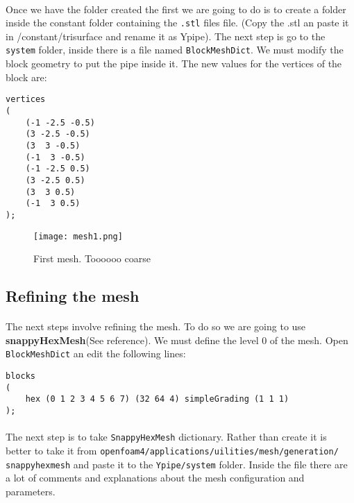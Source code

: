 \paragraph{}Once we have the folder created the first we are going to do is to create a folder inside the constant folder containing the \texttt{.stl} files file. (Copy the .stl an paste it in /constant/trisurface and rename it as Ypipe). The next step is  go to the  \texttt{system} folder, inside there is a file named \texttt{BlockMeshDict}. We must modify the block geometry to put the pipe inside it. The new values for the vertices of the block are:
\begin{center}
\begin{lstlisting}
vertices
(
    (-1 -2.5 -0.5)
    (3 -2.5 -0.5)
    (3  3 -0.5)
    (-1  3 -0.5)
    (-1 -2.5 0.5)
    (3 -2.5 0.5)
    (3  3 0.5)
    (-1  3 0.5)
);
\end{lstlisting}
\end{center}
\begin{figure}[h!]
\centering
\texttt{[image: mesh1.png]}
\caption{First mesh. Toooooo coarse}
\end{figure}

\subsection{Refining the mesh}
\paragraph{}The next steps involve refining the mesh. To do so we are going to use \textbf{snappyHexMesh}(See reference). We must define the level 0 of the mesh. Open \texttt{BlockMeshDict} an edit the following lines:
\begin{center}
\begin{lstlisting}
blocks
(
    hex (0 1 2 3 4 5 6 7) (32 64 4) simpleGrading (1 1 1)
);
\end{lstlisting}
\end{center}

\paragraph{}The next step is to take \texttt{SnappyHexMesh} dictionary. Rather than create it is better to take it from \texttt{openfoam4/applications/uilities/mesh/generation/\\snappyhexmesh} and paste it to the \texttt{Ypipe/system} folder. Inside the file there are a lot of comments and explanations about the mesh configuration and parameters.

